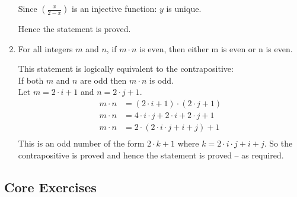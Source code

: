 \documentclass[10pt,\jkfside,a4paper]{article}
\begin{document}
\begin{enumerate}
Since $(\frac{x}{2 - x})$ is an injective function: $y$ is unique.

Hence the statement is proved.

\item For all integers $m$ and $n$, if $m\cdot n$ is even, then either m is 
even or n is even.

This statement is logically equivalent to the contrapositive:\\
If both $m$ and $n$ are odd then $m\cdot n$ is odd.\\
Let $m = 2\cdot i + 1$ and $n = 2\cdot j + 1$.
\begin{equation}
\begin{split}
m\cdot n &= (2\cdot i + 1)\cdot (2\cdot j + 1)\\
m\cdot n &= 4\cdot i\cdot j + 2\cdot i + 2\cdot j + 1\\
m\cdot n &= 2\cdot(2\cdot i\cdot j + i + j) + 1\\
\end{split}
\end{equation}
This is an odd number of the form $2\cdot k + 1$ where $k = 2\cdot i\cdot j + i + j$. 
So the contrapositive is proved and hence the statement is proved -- as required.

\end{enumerate}

\subsection{Core Exercises}
\end{document}
